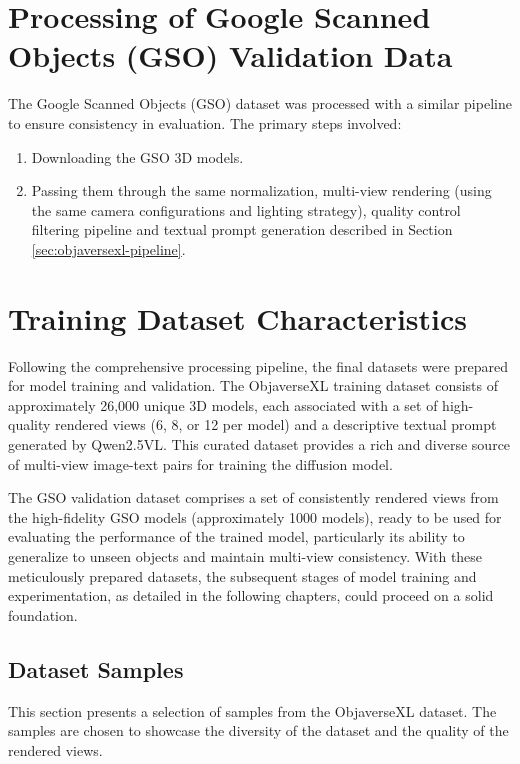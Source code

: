 \section{Processing of Google Scanned Objects (GSO) Validation Data}\label{sec:gso-processing}
The Google Scanned Objects (GSO) dataset was processed with a similar pipeline to ensure consistency in evaluation. The primary steps involved:
\begin{enumerate}
  \item Downloading the GSO 3D models.
  \item Passing them through the same normalization, multi-view rendering (using the same camera configurations and lighting strategy), quality control filtering pipeline and textual prompt generation described in Section \ref{sec:objaversexl-pipeline}.
\end{enumerate}

\section{Training Dataset Characteristics}\label{sec:final-dataset-chars}
Following the comprehensive processing pipeline, the final datasets were prepared for model training and validation.
The ObjaverseXL training dataset consists of approximately 26,000 unique 3D models, each associated with a set of high-quality rendered views (6, 8, or 12 per model) and a descriptive textual prompt generated by Qwen2.5VL. This curated dataset provides a rich and diverse source of multi-view image-text pairs for training the diffusion model.

The GSO validation dataset comprises a set of consistently rendered views from the high-fidelity GSO models (approximately 1000 models), ready to be used for evaluating the performance of the trained model, particularly its ability to generalize to unseen objects and maintain multi-view consistency.
With these meticulously prepared datasets, the subsequent stages of model training and experimentation, as detailed in the following chapters, could proceed on a solid foundation.


\subsection{Dataset Samples}\label{ssec:dataset-samples}
This section presents a selection of samples from the ObjaverseXL dataset. The samples are chosen to showcase the diversity of the dataset and the quality of the rendered views.


